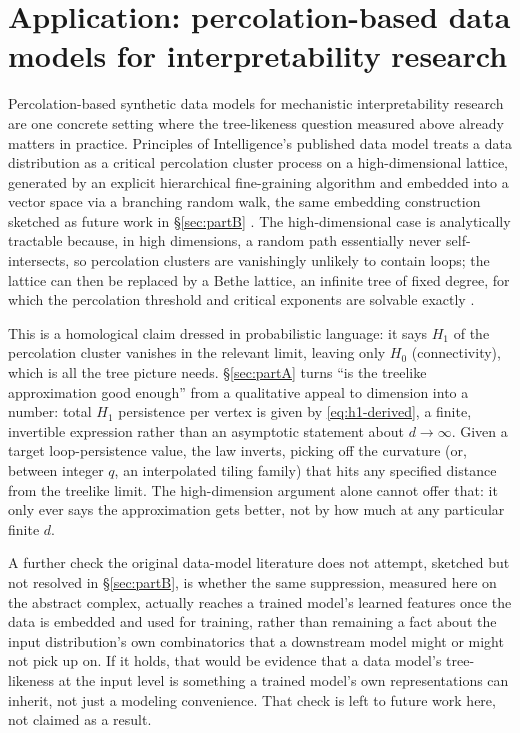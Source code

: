 \documentclass[11pt]{article}
\begin{document}
\section{Application: percolation-based data models for interpretability research}
\label{sec:brill}

Percolation-based synthetic data models for mechanistic interpretability research are one concrete setting where the tree-likeness question measured above already matters in practice. Principles of Intelligence's published data model treats a data distribution as a critical percolation cluster process on a high-dimensional lattice, generated by an explicit hierarchical fine-graining algorithm and embedded into a vector space via a branching random walk, the same embedding construction sketched as future work in \S\ref{sec:partB} \citep{brill2024,brill2025lattice}. The high-dimensional case is analytically tractable because, in high dimensions, a random path essentially never self-intersects, so percolation clusters are vanishingly unlikely to contain loops; the lattice can then be replaced by a Bethe lattice, an infinite tree of fixed degree, for which the percolation threshold and critical exponents are solvable exactly \citep{brill2025lattice,stauffer1994}.

This is a homological claim dressed in probabilistic language: it says $H_1$ of the percolation cluster vanishes in the relevant limit, leaving only $H_0$ (connectivity), which is all the tree picture needs. \S\ref{sec:partA} turns ``is the treelike approximation good enough'' from a qualitative appeal to dimension into a number: total $H_1$ persistence per vertex is given by \eqref{eq:h1-derived}, a finite, invertible expression rather than an asymptotic statement about $d\to\infty$. Given a target loop-persistence value, the law inverts, picking off the curvature (or, between integer $q$, an interpolated tiling family) that hits any specified distance from the treelike limit. The high-dimension argument alone cannot offer that: it only ever says the approximation gets better, not by how much at any particular finite $d$.

A further check the original data-model literature does not attempt, sketched but not resolved in \S\ref{sec:partB}, is whether the same suppression, measured here on the abstract complex, actually reaches a trained model's learned features once the data is embedded and used for training, rather than remaining a fact about the input distribution's own combinatorics that a downstream model might or might not pick up on. If it holds, that would be evidence that a data model's tree-likeness at the input level is something a trained model's own representations can inherit, not just a modeling convenience. That check is left to future work here, not claimed as a result.
\end{document}
